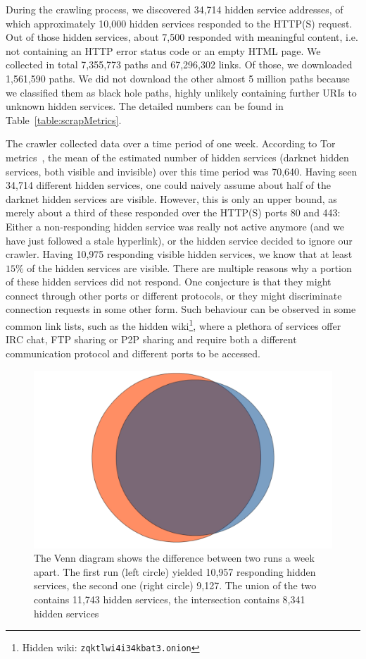 During the crawling process, we discovered 34,714 hidden service addresses, of which approximately 10,000 hidden services responded to the HTTP(S) request. Out of those hidden services, about 7,500 responded with meaningful content, i.e. not containing an HTTP error status code or an empty HTML page.
We collected in total 7,355,773 paths and 67,296,302 links. Of those, we downloaded 1,561,590 paths. We did not download the other almost 5 million paths because we classified them as black hole paths, highly unlikely containing further URIs to unknown hidden services. The detailed numbers can be found in Table~\ref{table:scrapMetrics}.


The crawler collected data over a time period of one week. According to Tor metrics~\cite{TorMetricsOnion}, the mean of the estimated number of hidden services (darknet hidden services, both visible and invisible) over this time period was 70,640. Having seen 34,714 different hidden services, one could naively assume about half of the darknet hidden services are visible. However, this is only an upper bound, as merely about a third of these responded over the HTTP(S) ports 80 and 443: Either a non-responding hidden service was really not active anymore (and we have just followed a stale hyperlink), or the hidden service decided to ignore our crawler. Having 10,975 responding visible hidden services, we know that at least $15\%$ of the hidden services are visible.
There are multiple reasons why a portion of these hidden services did not respond. One conjecture is that they might connect through other ports or different protocols, or they might discriminate connection requests in some other form.
Such behaviour can be observed in some common link lists, such as the hidden wiki\footnote{Hidden wiki: \texttt{zqktlwi4i34kbat3.onion}}, where a plethora of services offer IRC chat, FTP sharing or P2P sharing and require both a different communication protocol and different ports to be accessed.

\begin{figure}[H]
    \centering
    \includegraphics[width=0.7\linewidth]{images/DarknetVolatility.png}
    \caption{The Venn diagram shows the difference between two runs a week apart. The first run (left circle) yielded 10,957 responding hidden services, the second one (right circle) 9,127. The union of the two contains 11,743 hidden services, the intersection contains 8,341 hidden services}
    \label{fig:highVolatility}
\end{figure}

